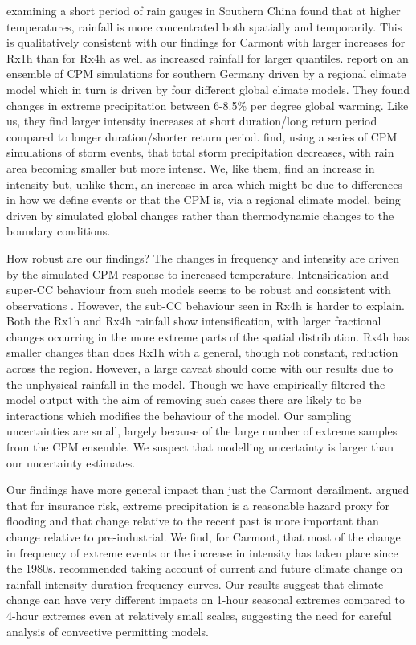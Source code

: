 \documentclass[11pt,a4paper]{article}
\begin{document}
 \cite{long2021rainfall_conc} examining a short period of rain gauges in Southern China found that at higher temperatures, rainfall is more concentrated both spatially and temporarily. This is qualitatively consistent with our findings for Carmont with larger increases for Rx1h than for Rx4h as well as increased rainfall for larger quantiles. \cite{hundhausen2024extreme_precip} report on an ensemble of CPM simulations for southern Germany driven by a regional climate model which in turn is driven by four different global climate models. They found changes in extreme precipitation between 6-8.5\% per degree global warming. Like us, they find larger intensity increases at short duration/long return period compared to longer duration/shorter return period. \cite{Moshe2022extremes} find, using a series of CPM simulations  of storm events, that total storm precipitation decreases, with rain area becoming smaller but more intense. We, like them, find an increase in intensity but, unlike them, an increase in area which might be due to differences in how we define events or that the CPM is, via a regional climate model, being driven by simulated global changes rather than thermodynamic changes to the boundary conditions. 


How robust are our findings? The changes in frequency and intensity are  driven by the simulated CPM response to increased temperature. Intensification and super-CC behaviour from such models seems to be robust and consistent with observations \parencite{fowler2021rainfall_extremes}. However, the sub-CC behaviour seen in Rx4h is harder to explain.  Both the Rx1h and Rx4h rainfall show intensification, with larger fractional changes occurring in the more extreme parts of the spatial distribution. Rx4h has smaller changes than does Rx1h with a general, though not constant, reduction across the region.   However, a large caveat should come with our results due to the unphysical rainfall in the model. Though we have empirically filtered the model output with the aim of removing such cases there are likely to be interactions which modifies the behaviour of the model. Our sampling uncertainties are small, largely because of the large number of extreme samples from the CPM ensemble. We suspect that modelling uncertainty is larger than our uncertainty estimates. 

Our findings have more general impact than just the Carmont derailment. \cite{lang2024catmodels} argued that  for insurance risk, extreme precipitation is a reasonable hazard proxy for flooding and  that change relative to the recent past is more important than change relative to pre-industrial. We find, for Carmont, that most of the change in frequency of extreme events or the increase in intensity has taken place since the 1980s.  \cite{martel2021rainfall_ifd} recommended taking account of current and future climate change on rainfall intensity duration frequency curves. Our results suggest that climate change can have very different impacts on 1-hour seasonal extremes compared to 4-hour extremes even at relatively small scales, suggesting the need for careful analysis of convective permitting models. 
\end{document}
